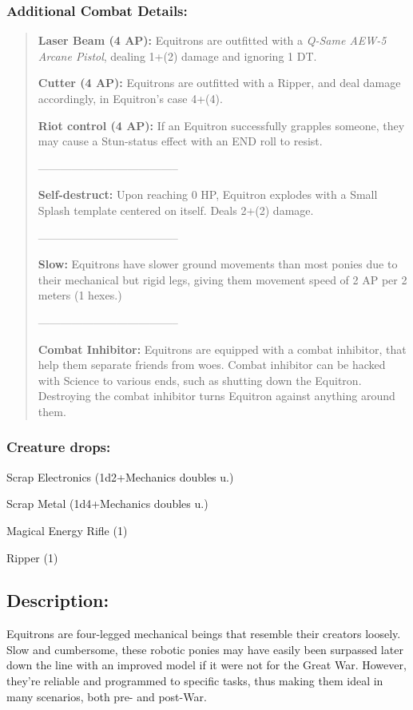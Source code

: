 \documentclass[11pt,a4paper,twocolumn]{book}
\begin{document}
	\subsubsection*{Additional Combat Details:}
	\begin{verse}
		\textbf{Laser Beam (4 AP):} Equitrons are outfitted with a \emph{Q-Same AEW-5 Arcane Pistol}, dealing 1+(2) damage and ignoring 1 DT.
		
		\textbf{Cutter (4 AP):} Equitrons are outfitted with a Ripper, and deal damage accordingly, in Equitron's case 4+(4).
		
		\textbf{Riot control (4 AP):} If an Equitron successfully grapples someone, they may cause a Stun-status effect with an END roll to resist.
		
--------------------------------------
		
		\textbf{Self-destruct:} Upon reaching 0 HP, Equitron explodes with a Small Splash template centered on itself. Deals 2+(2) damage.
		
--------------------------------------
		
		\textbf{Slow:} Equitrons have slower ground movements than most ponies due to their mechanical but rigid legs, giving them movement speed of 2 AP per 2 meters (1 hexes.)
		
--------------------------------------
		
		\textbf{Combat Inhibitor:} Equitrons are equipped with a combat inhibitor, that help them separate friends from woes. Combat inhibitor can be hacked with Science to various ends, such as shutting down the Equitron. Destroying the combat inhibitor turns Equitron against anything around them. 
		
	\end{verse}
	
	\subsubsection*{Creature drops:}
	\begin{compactitem}
		\item Scrap Electronics (1d2+Mechanics doubles u.)
		\item Scrap Metal (1d4+Mechanics doubles u.)
		\item Magical Energy Rifle (1)
		\item Ripper (1)
	\end{compactitem}
	
	\subsection*{Description:}
	Equitrons are four-legged mechanical beings that resemble their creators loosely. Slow and cumbersome, these robotic ponies may have easily been surpassed later down the line with an improved model if it were not for the Great War. However, they're reliable and programmed to specific tasks, thus making them ideal in many scenarios, both pre- and post-War.
	
\end{document}
